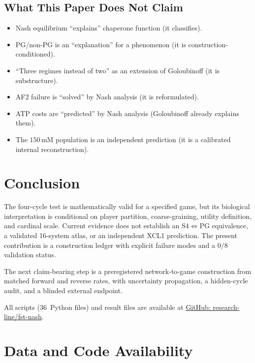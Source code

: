 \documentclass[12pt,a4paper]{article}
\begin{document}
\subsection{What This Paper Does Not Claim}

\begin{itemize}
  \item Nash equilibrium ``explains'' chaperone function (it classifies).
  \item PG/non-PG is an ``explanation'' for a phenomenon (it is
    construction-conditioned).
  \item ``Three regimes instead of two'' as an extension of Goloubinoff
    (it is substructure).
  \item AF2 failure is ``solved'' by Nash analysis (it is reformulated).
  \item ATP costs are ``predicted'' by Nash analysis (Goloubinoff
    already explains them).
  \item The $150$\,mM population is an independent prediction (it is a
    calibrated internal reconstruction).
\end{itemize}


\section{Conclusion}
\label{sec:conclusion}

The four-cycle test is mathematically valid for a specified game, but
its biological interpretation is conditional on player partition,
coarse-graining, utility definition, and cardinal scale. Current
evidence does not establish an $\mathrm{S4}\iff\mathrm{PG}$ equivalence, a
validated 16-system atlas, or an independent XCL1 prediction. The
present contribution is a construction ledger with explicit failure
modes and a $0/8$ validation status.

The next claim-bearing step is a preregistered network-to-game
construction from matched forward and reverse rates, with uncertainty
propagation, a hidden-cycle audit, and a blinded external endpoint.

All scripts (36~Python files) and result files are available at
\href{https://github.com/research-line/fst-nash}{GitHub: research-line/fst-nash}.


\section*{Data and Code Availability}
\end{document}
